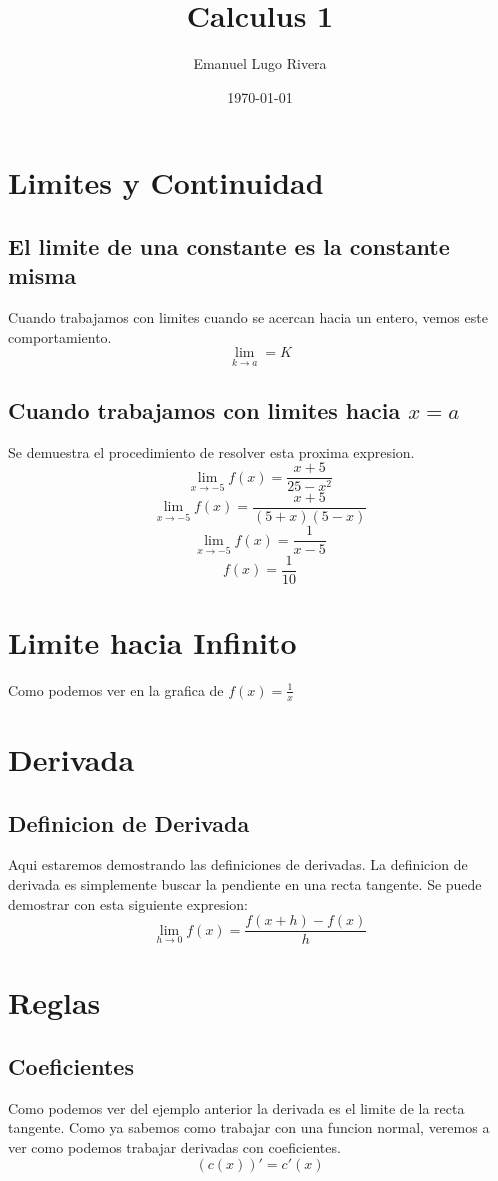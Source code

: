\documentclass[a4paper,12pt]{article}
\title{Calculus 1}
\author{Emanuel Lugo Rivera}
\date{\today}
\begin{document}
\begin{titlepage}
    \maketitle
\end{titlepage}


\section{Limites y Continuidad}
\subsection{El limite de una constante es la constante misma}
Cuando trabajamos con limites cuando se acercan hacia un entero, vemos este comportamiento.
$$\displaystyle \lim_{k\to a}= K$$
\subsection{Cuando trabajamos con limites hacia $x=a$}
Se demuestra el procedimiento de resolver esta proxima expresion.
$$\displaystyle \lim_{x\to-5} f(x)= \frac{x+5}{25-x^2}$$
$$\displaystyle\lim_{x\to-5} f(x)=\frac{x+5}{(5+x)(5-x)}$$
$$\displaystyle \lim_{x\to-5} f(x)=\frac{1}{x-5}$$
$$\displaystyle f(x)=\frac{1}{10}$$
\section{Limite hacia Infinito}
Como podemos ver en la grafica de $f(x)=\frac{1}{x}$


\section{Derivada}
\subsection{Definicion de Derivada}
Aqui estaremos demostrando las definiciones de derivadas. La definicion de derivada es simplemente buscar la pendiente en una recta tangente.
Se puede demostrar con esta siguiente expresion:
$$\lim_{h \to 0} f(x) = \frac{f(x+h)-f(x)}{h}$$

\section{Reglas}
\subsection{Coeficientes}
Como podemos ver del ejemplo anterior la derivada es el limite de la recta tangente.
Como ya sabemos como trabajar con una funcion normal, veremos a ver como podemos trabajar derivadas con coeficientes.
$$(c(x))'= c'(x)$$
\end{document}
